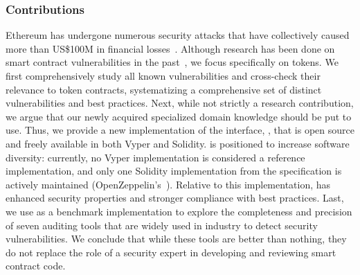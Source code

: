 \subsubsection*{Contributions} Ethereum has undergone numerous security attacks that have collectively caused more than US\$100M in financial losses~\cite{DAO1,PeckShield,PartiyMultiSig,MyEthWallet,ParityFirstHack,ParitySecondHack}. Although research has been done on smart contract vulnerabilities in the past~\cite{EthSecServ}, we focus specifically on \erc tokens. We first comprehensively study all known vulnerabilities and cross-check their relevance to \erc token contracts, systematizing a comprehensive set of distinct vulnerabilities and best practices. Next, while not strictly a research contribution, we argue that our newly acquired specialized domain knowledge should be put to use. Thus, we provide a new implementation of the \erc interface, \sys, that is open source and freely available in both Vyper and Solidity. \sys is positioned to increase software diversity: currently, no Vyper \erc implementation is considered a reference implementation, and only one Solidity implementation from the specification is actively maintained (OpenZeppelin's~\cite{OpenZepplin}). Relative to this implementation, \sys has enhanced security properties and stronger compliance with best practices. Last, we use \sys as a benchmark implementation to explore the completeness and precision of seven auditing tools that are widely used in industry to detect security vulnerabilities. We conclude that while these tools are better than nothing, they do not replace the role of a security expert in developing and reviewing smart contract code.





